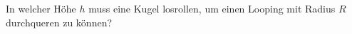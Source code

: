 \begin{Exercise}[label = Looping, origin = Maximilian Marienhagen, difficulty = 1, title = Looping]
In welcher Höhe $h$ muss eine Kugel losrollen, um einen Looping mit Radius $R$ durchqueren zu können?  
\end{Exercise}